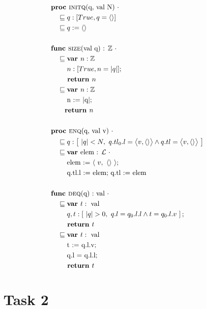 \documentclass[a4paper]{scrartcl}
\newcommand{\Z}{\mathbb{Z}}
\newcommand{\refinedby}{\sqsubseteq} %
\begin{document}
\begin{align*}
& \textbf{proc }\text{\textsc{initq}(q, val N) } \cdot \\ 
    &\quad \refinedby  q : [True, q = \langle \rangle ] \\
    & \quad \refinedby q := \langle \rangle \\\\
& \textbf{func }\text{\textsc{size}(val q) : }\Z~ \cdot \\
    & \quad \refinedby \textbf{var }n : \Z \\
    & \quad \quad ~ n : [True, n = |q|] ; \\
    & \quad \quad \textbf{ return } n\\
    & \quad \refinedby \textbf{var }n : \Z \\
    & \quad \quad  \text{ n := $|$q$|$;} \\
    & \quad \quad \textbf{return } n \\\\
& \textbf{proc }\text{\textsc{enq}(q, val v) } \cdot\\
    & \quad \refinedby q : \left[~|q|< N, ~q.tl_0.l = \big\langle v, \langle \rangle \big\rangle \land q.tl =  \big\langle v, \langle \rangle \big\rangle ~\right] \\
    & \quad \refinedby \textbf{var } \text{elem : $\mathcal{L}$ } \cdot\\
    & \quad \quad \text{ elem := }\langle~v,~\langle \rangle~\rangle ;\\
    & \quad \quad \text{ q.tl.l := elem; q.tl :=  elem}\\\\
& \textbf{func }\text{\textsc{deq}(q) :} \text{ val } \cdot \\
    & \quad \refinedby \textbf{var }t : \text{ val} \\
    & \quad \quad ~q, t : \left[~|q| > 0,~q.l = q_0.l.l \land t = q_0.l.v~\right]; \\
    & \quad \quad \textbf{ return }t \\
    & \quad \refinedby \textbf{var }t : \text{ val} \\
    & \quad  \quad \text{ t := q.l.v;} \\
    & \quad  \quad \text{ q.l = q.l.l;} \\
    & \quad \quad \textbf{ return }t \\
\end{align*}

\section*{Task 2}
\end{document}
